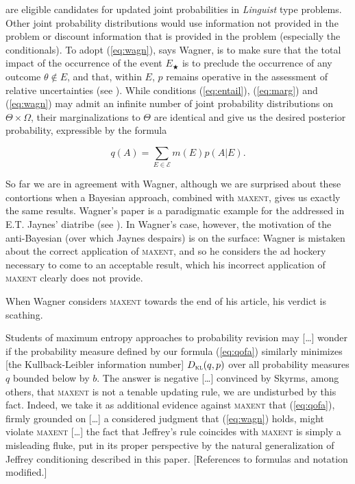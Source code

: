 \documentclass[11pt]{article}
\begin{document}
are eligible candidates for updated joint probabilities in
\emph{Linguist} type problems. Other joint probability distributions
would use information not provided in the problem or discount
information that is provided in the problem (especially the
conditionals). To adopt (\ref{eq:wagn}), says Wagner, is to make sure
that the total impact of the occurrence of the event $E_{\bigstar}$ is
to preclude the occurrence of any outcome $\theta\notin{}E$, and that,
within $E$, $p$ remains operative in the assessment of relative
uncertainties (see ). While conditions
(\ref{eq:entail}), (\ref{eq:marg}) and (\ref{eq:wagn}) may admit an
infinite number of joint probability distributions on
$\Theta\times\Omega$, their marginalizations to $\Theta$ are identical
and give us the desired posterior probability, expressible by the
formula

\begin{equation}
  \label{eq:qofa}
  q(A)=\sum_{E\in\mathcal{E}}m(E)p(A|E).
\end{equation}

So far we are in agreement with Wagner, although we are surprised
about these contortions when a Bayesian approach, combined with
\textsc{maxent}, gives us exactly the same results. Wagner's paper is
a paradigmatic example for the 
addressed in E.T. Jaynes' diatribe (see ). In
Wagner's case, however, the motivation of the anti-Bayesian (over
which Jaynes despairs) is on the surface: Wagner is mistaken about the
correct application of \textsc{maxent}, and so he considers the ad
hockery necessary to come to an acceptable result, which his incorrect
application of \textsc{maxent} clearly does not provide.

When Wagner considers \textsc{maxent} towards the end
of his article, his verdict is scathing. 

\begin{quotex}
  Students of maximum entropy approaches to probability revision may
  [\ldots] wonder if the probability measure defined by our formula
  (\ref{eq:qofa}) similarly minimizes [the Kullback-Leibler
  information number] $D_{\textsc{kl}}(q,p)$ over all probability
  measures $q$ bounded below by $b$. The answer is negative [\ldots]
  convinced by Skyrms, among others, that \textsc{maxent} is not a
  tenable updating rule, we are undisturbed by this fact. Indeed, we
  take it as additional evidence against \textsc{maxent} that
  (\ref{eq:qofa}), firmly grounded on [\ldots] a considered judgment
  that (\ref{eq:wagn}) holds, might violate \textsc{maxent} [\ldots]
  the fact that Jeffrey's rule coincides with \textsc{maxent} is
  simply a misleading fluke, put in its proper perspective by the
  natural generalization of Jeffrey conditioning described in
  this paper. [References to formulas and notation modified.]
\end{quotex}
\end{document}
